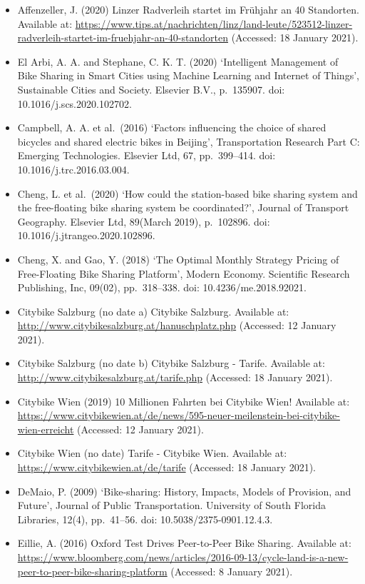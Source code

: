 \documentclass[
]{book}
\providecommand{\tightlist}{%
  \setlength{\itemsep}{0pt}\setlength{\parskip}{0pt}}
\begin{document}
\begin{itemize}
\tightlist
\item
  Affenzeller, J. (2020) Linzer Radverleih startet im Frühjahr an 40 Standorten. Available at: \url{https://www.tips.at/nachrichten/linz/land-leute/523512-linzer-radverleih-startet-im-fruehjahr-an-40-standorten} (Accessed: 18 January 2021).
\item
  El Arbi, A. A. and Stephane, C. K. T. (2020) `Intelligent Management of Bike Sharing in Smart Cities using Machine Learning and Internet of Things', Sustainable Cities and Society. Elsevier B.V., p.~135907. doi: 10.1016/j.scs.2020.102702.
\item
  Campbell, A. A. et al.~(2016) `Factors influencing the choice of shared bicycles and shared electric bikes in Beijing', Transportation Research Part C: Emerging Technologies. Elsevier Ltd, 67, pp.~399--414. doi: 10.1016/j.trc.2016.03.004.
\item
  Cheng, L. et al.~(2020) `How could the station-based bike sharing system and the free-floating bike sharing system be coordinated?', Journal of Transport Geography. Elsevier Ltd, 89(March 2019), p.~102896. doi: 10.1016/j.jtrangeo.2020.102896.
\item
  Cheng, X. and Gao, Y. (2018) `The Optimal Monthly Strategy Pricing of Free-Floating Bike Sharing Platform', Modern Economy. Scientific Research Publishing, Inc, 09(02), pp.~318--338. doi: 10.4236/me.2018.92021.
\item
  Citybike Salzburg (no date a) Citybike Salzburg. Available at: \url{http://www.citybikesalzburg.at/hanuschplatz.php} (Accessed: 12 January 2021).
\item
  Citybike Salzburg (no date b) Citybike Salzburg - Tarife. Available at: \url{http://www.citybikesalzburg.at/tarife.php} (Accessed: 18 January 2021).
\item
  Citybike Wien (2019) 10 Millionen Fahrten bei Citybike Wien! Available at: \url{https://www.citybikewien.at/de/news/595-neuer-meilenstein-bei-citybike-wien-erreicht} (Accessed: 12 January 2021).
\item
  Citybike Wien (no date) Tarife - Citybike Wien. Available at: \url{https://www.citybikewien.at/de/tarife} (Accessed: 18 January 2021).
\item
  DeMaio, P. (2009) `Bike-sharing: History, Impacts, Models of Provision, and Future', Journal of Public Transportation. University of South Florida Libraries, 12(4), pp.~41--56. doi: 10.5038/2375-0901.12.4.3.
\item
  Eillie, A. (2016) Oxford Test Drives Peer-to-Peer Bike Sharing. Available at: \url{https://www.bloomberg.com/news/articles/2016-09-13/cycle-land-is-a-new-peer-to-peer-bike-sharing-platform} (Accessed: 8 January 2021).

\end{itemize}
\end{document}
